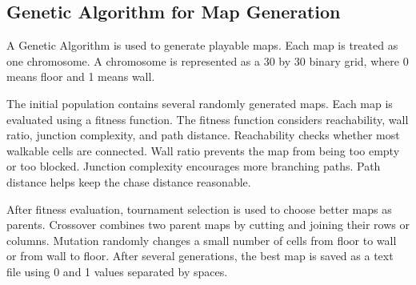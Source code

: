 \subsection{Genetic Algorithm for Map Generation}

A Genetic Algorithm is used to generate playable maps. Each map is treated as one chromosome. A chromosome is represented as a 30 by 30 binary grid, where 0 means floor and 1 means wall.

The initial population contains several randomly generated maps. Each map is evaluated using a fitness function. The fitness function considers reachability, wall ratio, junction complexity, and path distance. Reachability checks whether most walkable cells are connected. Wall ratio prevents the map from being too empty or too blocked. Junction complexity encourages more branching paths. Path distance helps keep the chase distance reasonable.

After fitness evaluation, tournament selection is used to choose better maps as parents. Crossover combines two parent maps by cutting and joining their rows or columns. Mutation randomly changes a small number of cells from floor to wall or from wall to floor. After several generations, the best map is saved as a text file using 0 and 1 values separated by spaces.
